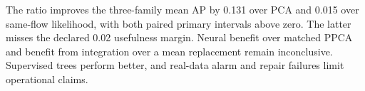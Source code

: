 The ratio improves the three-family mean AP by 0.131 over PCA and 0.015 over same-flow likelihood, with both paired primary intervals above zero. The latter misses the declared 0.02 usefulness margin. Neural benefit over matched PPCA and benefit from integration over a mean replacement remain inconclusive. Supervised trees perform better, and real-data alarm and repair failures limit operational claims.
